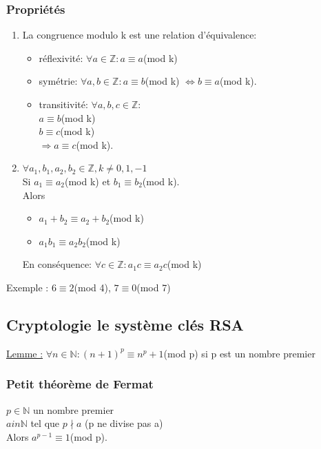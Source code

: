 \documentclass[11pt]{article}
\begin{document}
			\subsubsection{Propriétés}
				\begin{enumerate}
			 		\item La congruence modulo k est une relation d'équivalence:
					\begin{itemize}
						 \item réflexivité: $\forall a \in \mathbb{Z}: a \equiv a$(mod k)
						 \item symétrie: $\forall a, b \in \mathbb{Z}: a \equiv b$(mod k) $\Leftrightarrow b \equiv a$(mod k).
						 \item transitivité: $\forall a, b, c \in \mathbb{Z}:$\\
							$a \equiv b$(mod k)\\
							$b \equiv c$(mod k)\\
							$\Rightarrow a \equiv c$(mod k).
					\end{itemize}
			 		\item $\forall a_1, b_1, a_2, b_2 \in \mathbb{Z}, k \neq 0, 1, -1$\\
					Si $a_1 \equiv a_2$(mod k) et $b_1 \equiv b_2$(mod k).\\
					Alors
					\begin{itemize}
						\item $a_1 + b_2 \equiv a_2 + b_2$(mod k)
						\item $a_1 b_1 \equiv a_2 b_2$(mod k)
					\end{itemize}
					En conséquence: $\forall c \in \mathbb{Z}: a_1 c \equiv a_2 c$(mod k)
				\end{enumerate}
				Exemple : $6 \equiv 2$(mod 4), $7 \equiv 0$(mod 7)
	
		\subsection{Cryptologie le système clés RSA}
			\underline{Lemme :} 
			$\forall n \in \mathbb{N}: (n+1)^p \equiv n^p + 1$(mod p) si p est un nombre premier
			
			\subsubsection{Petit théorème de Fermat}
				$p \in \mathbb{N}$ un nombre premier\\
				$a  in \mathbb{N}$ tel que $p \nmid a$ (p ne divise pas a)\\
				Alors $a^{p-1} \equiv 1$(mod p). \\
			
\end{document}
